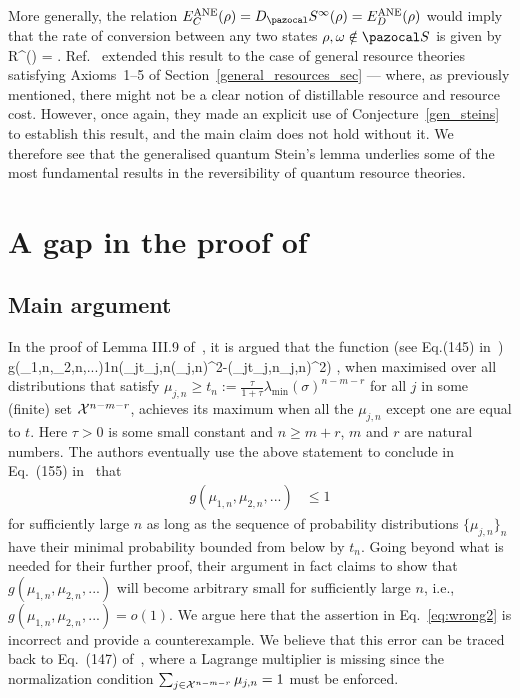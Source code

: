 \documentclass[11pt,notitlepage,tightenlines,nofootinbib,superscriptaddress]{revtex4-1}
\begin{document}
More generally, the relation $E_C^{\mathrm{ANE}}(\rho) = D_\SEP^\infty(\rho) = E_D^{\mathrm{ANE}}(\rho) $ would imply that the rate of conversion between any two states $\rho, \omega \notin \SEP$ is given by
\bb
R^{}(\rho\to \omega) = .
\label{rate_ratio_D_S}
\ee
Ref.~\cite{Brandao-Gour} extended this result to the case of general resource theories satisfying Axioms~1--5 of Section~\ref{general_resources_sec} --- where, as previously mentioned, there might not be a clear notion of distillable resource and resource cost. However, once again, they made an explicit use of Conjecture~\ref{gen_steins} to establish this result, and the main claim does not hold without it. We therefore see that the generalised quantum Stein's lemma underlies some of the most fundamental results in the reversibility of quantum resource theories.



\section{A gap in the proof of~\cite[Lemma III.9]{Brandao2010}}\label{sec:gap}

\subsection{Main argument}

In the proof of Lemma III.9 of~\cite{Brandao2010}, it is argued that the function (see Eq.(145) in~\cite{Brandao2010})
\bb
g(\mu_{1,n},\mu_{2,n},...)\eqdef\frac1n\left(\sum_{j}t_{j,n}(\log\mu_{j,n})^2-\left(\sum_jt_{j,n}\log\mu_{j,n}\right)^2\right) , \label{eq:wrong1}
\ee
when maximised over all distributions that satisfy $\mu_{j,n} \geq t_n := \frac\tau{1+\tau}\lambda_{\min}(\sigma)^{n-m-r}$ for all $j$ in some (finite) set $\mathcal{X}^{n-m-r}$, achieves its maximum when all the $\mu_{j,n}$ except one are equal to $t$. Here $\tau > 0$ is some small constant and $n \geq m+r$, $m$ and $r$ are natural numbers. The authors eventually use the above statement to conclude in Eq.~(155) in~\cite{Brandao2010} that
\begin{align}
    g(\mu_{1,n},\mu_{2,n},...)
    &\leq 1 \label{eq:wrong2}
\end{align}
for sufficiently large $n$ as long as the sequence of probability distributions $\{\mu_{j,n}\}_n$ have their minimal probability bounded from below by $t_n$.
%
Going beyond what is needed for their further proof, their argument in fact claims to show that $g(\mu_{1,n},\mu_{2,n},...)$ will become arbitrary small for sufficiently large $n$, i.e., $g(\mu_{1,n},\mu_{2,n},...) = o(1)$.
%
We argue here that the assertion in Eq.~\eqref{eq:wrong2} is incorrect and provide a counterexample. We believe that this error can be traced back to Eq.~(147) of~\cite{Brandao2010}, where a Lagrange multiplier is missing since the normalization condition $\sum_{j \in\mathcal{X}^{n-m-r}} \mu_{j,n} = 1$ must be enforced.
\end{document}
